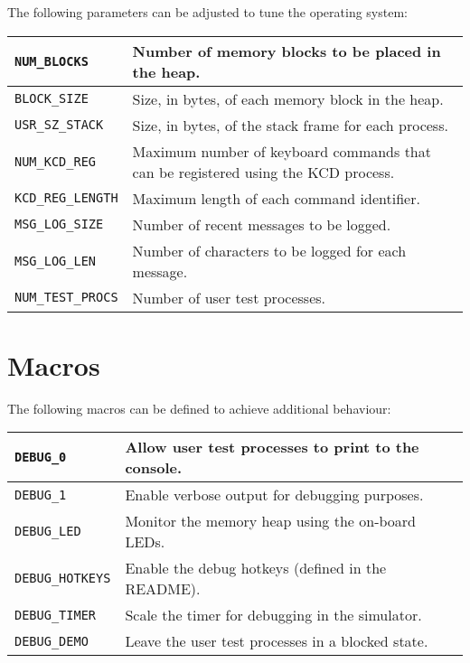 \documentclass[12pt]{report}
\begin{document}
The following parameters can be adjusted to tune the operating system:\\

\begin{tabularx}{\textwidth}{| l | X |}
    \hline
    \texttt{NUM_BLOCKS} & Number of memory blocks to be placed in the heap.\\
    \hline
    \texttt{BLOCK_SIZE} & Size, in bytes, of each memory block in the heap.\\
    \hline
    \texttt{USR_SZ_STACK} & Size, in bytes, of the stack frame for each process.\\
    \hline
    \texttt{NUM_KCD_REG} & Maximum number of keyboard commands that can be registered using the KCD process.\\
    \hline
    \texttt{KCD_REG_LENGTH} & Maximum length of each command identifier.\\
    \hline
    \texttt{MSG_LOG_SIZE} & Number of recent messages to be logged.\\
    \hline
    \texttt{MSG_LOG_LEN} & Number of characters to be logged for each message.\\
    \hline
    \texttt{NUM_TEST_PROCS} & Number of user test processes.\\
    \hline
\end{tabularx}

\section{Macros}

The following macros can be defined to achieve additional behaviour:\\

\begin{tabularx}{\textwidth}{| l | X |}
    \hline
    \texttt{DEBUG_0} & Allow user test processes to print to the console.\\
    \hline
    \texttt{DEBUG_1} & Enable verbose output for debugging purposes.\\
    \hline
    \texttt{DEBUG_LED} & Monitor the memory heap using the on-board LEDs.\\
    \hline
    \texttt{DEBUG_HOTKEYS} & Enable the debug hotkeys (defined in the README).\\
    \hline
    \texttt{DEBUG_TIMER} & Scale the timer for debugging in the simulator.\\
    \hline
    \texttt{DEBUG_DEMO} & Leave the user test processes in a blocked state.\\
    \hline
\end{tabularx}
\end{document}
